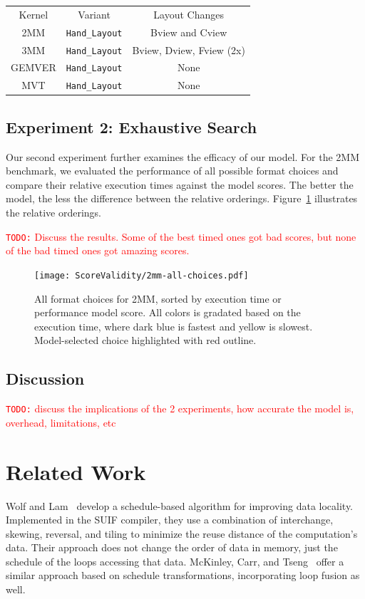 \documentclass[sigconf, table]{acmart}
\newcommand{\todo}[1]{{\textcolor{red}{{\tt{TODO:}}\,\,#1 }}}
\begin{document}
\begin{table}
	\centering
	\begin{tabular}{c|c|c}
		Kernel & Variant & Layout Changes \\
		2MM & \verb.Hand_Layout. & Bview and Cview \\
		3MM & \verb.Hand_Layout. & Bview, Dview, Fview (2x) \\
		GEMVER & \verb.Hand_Layout. & None \\
		MVT & \verb.Hand_Layout. & None 
	\end{tabular}
\end{table}


\subsection{Experiment 2: Exhaustive Search}

Our second experiment further examines the efficacy of our model. 
For the 2MM benchmark, we evaluated the performance of all possible format choices and compare their relative execution times against the model scores. 
The better the model, the less the difference between the relative orderings.
Figure~\ref{2MMAllChoices} illustrates the relative orderings. 

\todo{Discuss the results. Some of the best timed ones got bad scores, but none of the bad timed ones got amazing scores.}


\begin{figure}
	\texttt{[image: ScoreValidity/2mm-all-choices.pdf]}
	\caption{All format choices for 2MM, sorted by execution time or performance model score. All colors is gradated based on the execution time, where dark blue is fastest and yellow is slowest. Model-selected choice highlighted with red outline.}
	\label{2MMAllChoices}
\end{figure}


\subsection{Discussion}

\todo{discuss the implications of the 2 experiments, how accurate the model is, overhead, limitations, etc}

\section{Related Work}

Wolf and Lam~\cite{wolf1991data} develop a schedule-based algorithm for improving data locality. 
Implemented in the SUIF compiler, they use a combination of interchange, skewing, reversal, and tiling to minimize the reuse distance of the computation's data. 
Their approach does not change the order of data in memory, just the schedule of the loops accessing that data.
McKinley, Carr, and Tseng~\cite{mckinley1996improving} offer a similar approach based on schedule transformations, incorporating loop fusion as well.
\end{document}
